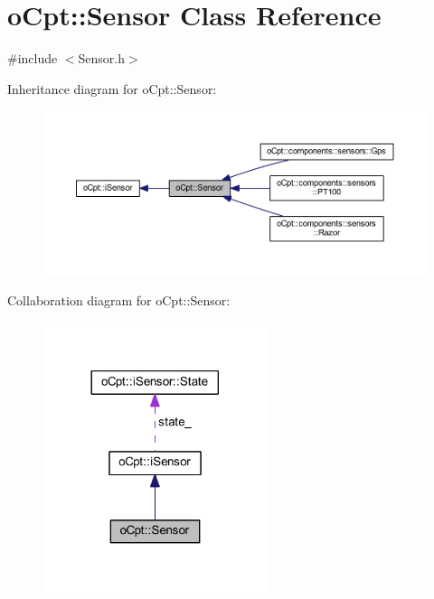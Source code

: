 \hypertarget{classo_cpt_1_1_sensor}{}\section{o\+Cpt\+:\+:Sensor Class Reference}
\label{classo_cpt_1_1_sensor}


{\ttfamily \#include $<$Sensor.\+h$>$}



Inheritance diagram for o\+Cpt\+:\+:Sensor\+:\nopagebreak
\begin{figure}[H]
\begin{center}
\leavevmode
\includegraphics[width=350pt]{classo_cpt_1_1_sensor__inherit__graph}
\end{center}
\end{figure}


Collaboration diagram for o\+Cpt\+:\+:Sensor\+:\nopagebreak
\begin{figure}[H]
\begin{center}
\leavevmode
\includegraphics[width=185pt]{classo_cpt_1_1_sensor__coll__graph}
\end{center}
\end{figure}
